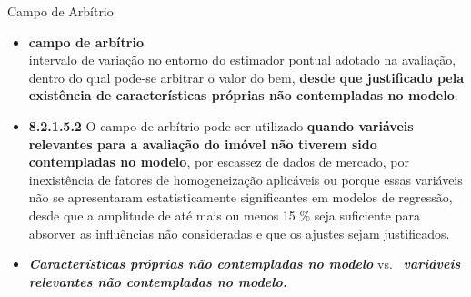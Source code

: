 \documentclass[9pt,ignorenonframetext,aspectratio=169]{beamer}
\providecommand{\tightlist}{%
  \setlength{\itemsep}{0pt}\setlength{\parskip}{0pt}}
\begin{document}
\begin{frame}{Campo de Arbítrio}
\protect\hypertarget{campo-de-arbuxedtrio}{}

\begin{itemize}[<+->]
\tightlist
\item
  \textbf{campo de arbítrio}\\
  intervalo de variação no entorno do estimador pontual adotado na
  avaliação, dentro do qual pode-se arbitrar o valor do bem,
  \textbf{desde que justificado 
  pela existência de características próprias não contempladas no modelo}.
  \autocite[3, grifo nosso]{NBR1465301}
\end{itemize}

\begin{itemize}[<+->]
\tightlist
\item
  \textbf{8.2.1.5.2} O campo de arbítrio pode ser utilizado
  \textbf{quando variáveis 
  relevantes para a avaliação do imóvel não tiverem sido contempladas no modelo},
  por escassez de dados de mercado, por inexistência de fatores de
  homogeneização aplicáveis ou porque essas variáveis não se
  apresentaram estatisticamente significantes em modelos de regressão,
  desde que a amplitude de até mais ou menos 15 \% seja suficiente para
  absorver as influências não consideradas e que os ajustes sejam
  justificados.\\
  \autocite[17, grifo nosso]{NBR1465302}
\end{itemize}

\begin{itemize}[<+->]
\tightlist
\item
  \emph{\textbf{Características próprias não contempladas no modelo}}
  vs.~ \emph{\textbf{variáveis relevantes não contempladas no modelo.}}
\end{itemize}

\end{frame}
\end{document}
